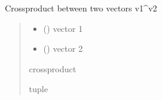 \documentclass[letterpaper,10pt,english]{sphinxmanual}
\begin{document}
\begin{fulllineitems}
\label{\detokenize{reference:basicgeometry.crossproduct}}
\pysigstartsignatures
{}
\pysigstopsignatures
\sphinxAtStartPar
Crossproduct between two vectors v1\textasciicircum{}v2
\begin{quote}\begin{description}
\begin{itemize}
\item {} 
\sphinxAtStartPar
{} () \textendash{} vector 1

\item {} 
\sphinxAtStartPar
{} () \textendash{} vector 2

\end{itemize}

\sphinxAtStartPar
crossproduct

\sphinxhyphen{}tuple

\end{description}\end{quote}

\end{fulllineitems}

\end{document}
